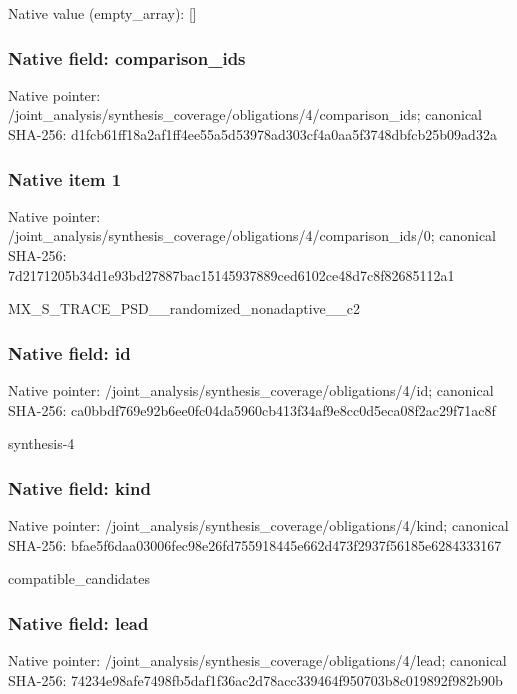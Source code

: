\documentclass[10pt,a4paper]{article}
\begin{document}
Native value (empty\_\allowbreak{}array): []

\subsubsection{Native field: comparison\_\allowbreak{}ids}
Native pointer: /joint\_\allowbreak{}analysis/synthesis\_\allowbreak{}coverage/obligations/4/comparison\_\allowbreak{}ids; canonical SHA-256: d1fcb61ff18a2af1ff4ee55a5d53978ad303cf4a0aa5f3748dbfcb25b09ad32a

\subsubsection{Native item 1}
Native pointer: /joint\_\allowbreak{}analysis/synthesis\_\allowbreak{}coverage/obligations/4/comparison\_\allowbreak{}ids/0; canonical SHA-256: 7d2171205b34d1e93bd27887bac15145937889ced6102ce48d7c8f82685112a1

\begingroup\raggedright\sloppy MX\_\allowbreak{}S\_\allowbreak{}TRACE\_\allowbreak{}PSD\_\allowbreak{}\_\allowbreak{}randomized\_\allowbreak{}nonadaptive\_\allowbreak{}\_\allowbreak{}c2\par\endgroup

\subsubsection{Native field: id}
Native pointer: /joint\_\allowbreak{}analysis/synthesis\_\allowbreak{}coverage/obligations/4/id; canonical SHA-256: ca0bbdf769e92b6ee0fc04da5960cb413f34af9e8cc0d5eca08f2ac29f71ac8f

\begingroup\raggedright\sloppy synthesis-4\par\endgroup

\subsubsection{Native field: kind}
Native pointer: /joint\_\allowbreak{}analysis/synthesis\_\allowbreak{}coverage/obligations/4/kind; canonical SHA-256: bfae5f6daa03006fec98e26fd755918445e662d473f2937f56185e6284333167

\begingroup\raggedright\sloppy compatible\_\allowbreak{}candidates\par\endgroup

\subsubsection{Native field: lead}
Native pointer: /joint\_\allowbreak{}analysis/synthesis\_\allowbreak{}coverage/obligations/4/lead; canonical SHA-256: 74234e98afe7498fb5daf1f36ac2d78acc339464f950703b8c019892f982b90b
\end{document}
